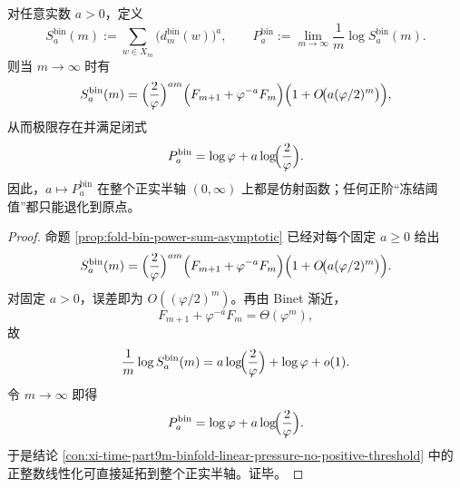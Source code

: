 \begin{theorem}\label{thm:xi-time-part9t-binfold-positive-axis-linear-pressure}
对任意实数 \(a>0\)，定义
\[
S_a^{\mathrm{bin}}(m):=\sum_{w\in X_m}\bigl(d_m^{\mathrm{bin}}(w)\bigr)^a,
\qquad
P_a^{\mathrm{bin}}:=\lim_{m\to\infty}\frac1m\log S_a^{\mathrm{bin}}(m).
\]
则当 \(m\to\infty\) 时有
\[
S_a^{\mathrm{bin}}(m)
=
\Bigl(\frac{2}{\varphi}\Bigr)^{am}
\Bigl(F_{m+1}+\varphi^{-a}F_m\Bigr)
\Bigl(1+O\!\bigl(a(\varphi/2)^m\bigr)\Bigr),
\]
从而极限存在并满足闭式
\[
P_a^{\mathrm{bin}}
=
\log\varphi+a\log\!\Bigl(\frac{2}{\varphi}\Bigr).
\]
因此，\(a\mapsto P_a^{\mathrm{bin}}\) 在整个正实半轴 \((0,\infty)\) 上都是仿射函数；任何正阶“冻结阈值”都只能退化到原点。
\end{theorem}
\begin{proof}
命题 \ref{prop:fold-bin-power-sum-asymptotic} 已经对每个固定 \(a\ge 0\) 给出
\[
S_a^{\mathrm{bin}}(m)
=
\Bigl(\frac{2}{\varphi}\Bigr)^{am}
\Bigl(F_{m+1}+\varphi^{-a}F_m\Bigr)
\Bigl(1+O\!\bigl(a(\varphi/2)^m\bigr)\Bigr).
\]
对固定 \(a>0\)，误差即为 \(O((\varphi/2)^m)\)。再由 Binet 渐近，
\[
F_{m+1}+\varphi^{-a}F_m=\Theta(\varphi^m),
\]
故
\[
\frac1m\log S_a^{\mathrm{bin}}(m)
=
a\log\!\Bigl(\frac{2}{\varphi}\Bigr)+\log\varphi+o(1).
\]
令 \(m\to\infty\) 即得
\[
P_a^{\mathrm{bin}}
=
\log\varphi+a\log\!\Bigl(\frac{2}{\varphi}\Bigr).
\]
于是结论 \ref{con:xi-time-part9m-binfold-linear-pressure-no-positive-threshold} 中的正整数线性化可直接延拓到整个正实半轴。证毕。
\end{proof}


